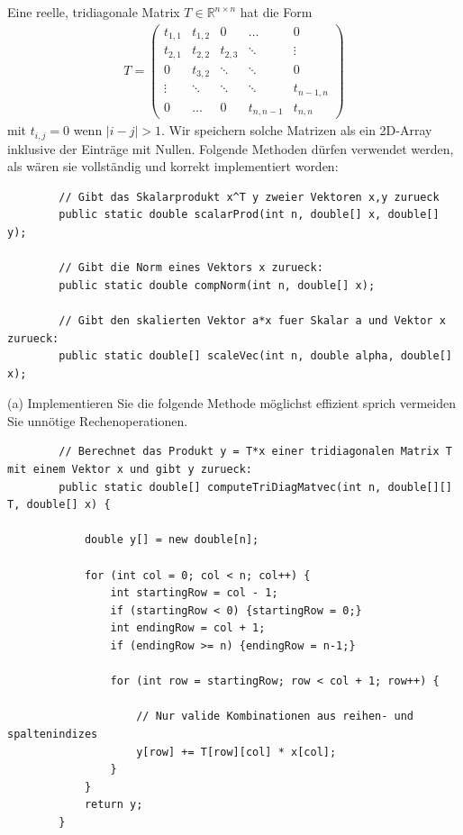 \documentclass{scrartcl}
\begin{document}
	
	
	
	
	Eine reelle, tridiagonale Matrix $T \in \mathbb{R}^{n \times n}$ hat die Form
	\begin{align*}
	T = \begin{pmatrix}
	t_{1,1} & t_{1,2} & 0 & \dots & 0 \\
	t_{2,1} & t_{2,2} & t_{2,3} & \ddots & \vdots \\
	0 & t_{3,2} & \ddots & \ddots & 0 \\
	\vdots & \ddots & \ddots & \ddots & t_{n-1,n} \\
	0 & \dots & 0 & t_{n,n-1} & t_{n,n}
	\end{pmatrix}
	\end{align*}
	mit $t_{i,j}  = 0$ wenn $|i-j| > 1$. Wir speichern solche Matrizen als ein 2D-Array inklusive der Einträge mit Nullen.
	\n 
	Folgende Methoden dürfen verwendet werden, als wären sie vollständig und korrekt implementiert worden:		
	\begin{lstlisting}
		// Gibt das Skalarprodukt x^T y zweier Vektoren x,y zurueck
		public static double scalarProd(int n, double[] x, double[] y);
		
		// Gibt die Norm eines Vektors x zurueck:
		public static double compNorm(int n, double[] x);
		
		// Gibt den skalierten Vektor a*x fuer Skalar a und Vektor x zurueck:
		public static double[] scaleVec(int n, double alpha, double[] x);
	\end{lstlisting}
	\lbreak
	(a) 
	Implementieren Sie die folgende Methode möglichst effizient sprich vermeiden Sie unnötige Rechenoperationen.
	\begin{lstlisting}
		// Berechnet das Produkt y = T*x einer tridiagonalen Matrix T mit einem Vektor x und gibt y zurueck:
		public static double[] computeTriDiagMatvec(int n, double[][] T, double[] x) {
		
			double y[] = new double[n];
		
			for (int col = 0; col < n; col++) {
				int startingRow = col - 1;
				if (startingRow < 0) {startingRow = 0;}
				int endingRow = col + 1;
				if (endingRow >= n) {endingRow = n-1;}
				
				for (int row = startingRow; row < col + 1; row++) {
					
					// Nur valide Kombinationen aus reihen- und spaltenindizes
					y[row] += T[row][col] * x[col];
				}
			}
			return y;
		}
	\end{lstlisting}
\end{document}
